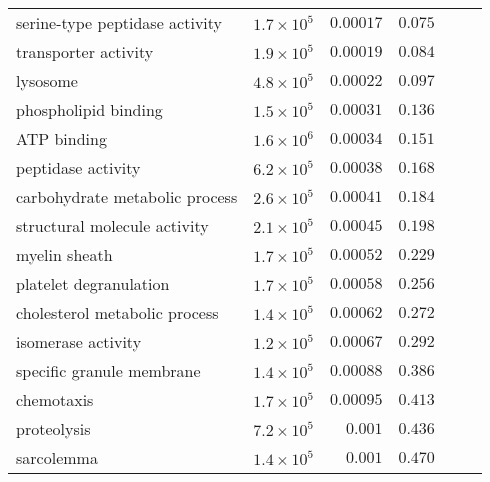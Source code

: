 \documentclass{article}
\begin{document}
\begin{longtable}{|l|r|r|r|r|r|}
            serine-type peptidase activity & $1.7\times 10^{5}$ &            $0.00017$ &                     $ 0.075~~$ \\
                      transporter activity & $1.9\times 10^{5}$ &            $0.00019$ &                     $ 0.084~~$ \\
                                  lysosome & $4.8\times 10^{5}$ &            $0.00022$ &                     $ 0.097~~$ \\
                      phospholipid binding & $1.5\times 10^{5}$ &            $0.00031$ &                     $ 0.136~~$ \\
                               ATP binding & $1.6\times 10^{6}$ &            $0.00034$ &                     $ 0.151~~$ \\
                        peptidase activity & $6.2\times 10^{5}$ &            $0.00038$ &                     $ 0.168~~$ \\
            carbohydrate metabolic process & $2.6\times 10^{5}$ &            $0.00041$ &                     $ 0.184~~$ \\
              structural molecule activity & $2.1\times 10^{5}$ &            $0.00045$ &                     $ 0.198~~$ \\
                             myelin sheath & $1.7\times 10^{5}$ &            $0.00052$ &                     $ 0.229~~$ \\
                    platelet degranulation & $1.7\times 10^{5}$ &            $0.00058$ &                     $ 0.256~~$ \\
             cholesterol metabolic process & $1.4\times 10^{5}$ &            $0.00062$ &                     $ 0.272~~$ \\
                        isomerase activity & $1.2\times 10^{5}$ &            $0.00067$ &                     $ 0.292~~$ \\
                 specific granule membrane & $1.4\times 10^{5}$ &            $0.00088$ &                     $ 0.386~~$ \\
                                chemotaxis & $1.7\times 10^{5}$ &            $0.00095$ &                     $ 0.413~~$ \\
                               proteolysis & $7.2\times 10^{5}$ &             $ 0.001$ &                     $ 0.436~~$ \\
                                sarcolemma & $1.4\times 10^{5}$ &             $ 0.001$ &                     $ 0.470~~$ \\

\end{longtable}
\end{document}
